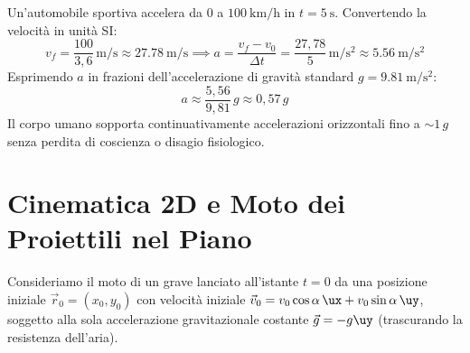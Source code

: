 \begin{esempio}
Un'automobile sportiva accelera da $0$ a $\SI{100}{\kilo\metre\per\hour}$ in $t = \SI{5}{\second}$.
Convertendo la velocità in unità SI:
\begin{equation}
    v_f = \frac{100}{3{,}6}\,\si{\metre\per\second} \approx \SI{27.78}{\metre\per\second} \implies a = \frac{v_f - v_0}{\Delta t} = \frac{27{,}78}{5}\,\si{\metre\per\second\squared} \approx \SI{5.56}{\metre\per\second\squared}
\end{equation}
Esprimendo $a$ in frazioni dell'accelerazione di gravità standard $g = \SI{9.81}{\metre\per\second\squared}$:
\begin{equation}
    a \approx \frac{5{,}56}{9{,}81}\,g \approx 0{,}57\,g
\end{equation}
Il corpo umano sopporta continuativamente accelerazioni orizzontali fino a $\sim 1\,g$ senza perdita di coscienza o disagio fisiologico.
\end{esempio}

\section{Cinematica 2D e Moto dei Proiettili nel Piano}
\label{sec:moto_proiettile}

Consideriamo il moto di un grave lanciato all'istante $t=0$ da una posizione iniziale $\vec{r}_0 = (x_0, y_0)$ con velocità iniziale $\vec{v}_0 = v_0\cos\alpha\,\ux + v_0\sin\alpha\,\uy$, soggetto alla sola accelerazione gravitazionale costante $\vec{g} = -g\uy$ (trascurando la resistenza dell'aria).

